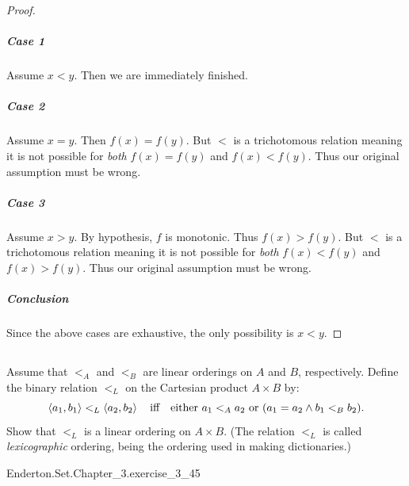 \documentclass{report}
\begin{document}
\begin{proof}
      \subparagraph{Case 1}%

        Assume $x < y$.
        Then we are immediately finished.

      \subparagraph{Case 2}%

        Assume $x = y$.
        Then $f(x) = f(y)$.
        But $<$ is a trichotomous relation meaning it is not possible for
          \textit{both} $f(x) = f(y)$ and $f(x) < f(y)$.
        Thus our original assumption must be wrong.

      \subparagraph{Case 3}%

        Assume $x > y$.
        By hypothesis, $f$ is monotonic.
        Thus $f(x) > f(y)$.
        But $<$ is a trichotomous relation meaning it is not possible for
          \textit{both} $f(x) < f(y)$ and $f(x) > f(y)$.
        Thus our original assumption must be wrong.

      \subparagraph{Conclusion}%

        Since the above cases are exhaustive, the only possibility is $x < y$.

  \end{proof}

\subsection{}%

  Assume that $<_A$ and $<_B$ are linear orderings on $A$ and $B$, respectively.
  Define the binary relation $<_L$ on the Cartesian product $A \times B$ by:
    $$\left< a_1, b_1 \right> <_L \left< a_2, b_2 \right> \quad\text{iff}\quad
      \text{either } a_1 <_A a_2 \text{ or } (a_1 = a_2 \land b_1 <_B b_2).$$
  Show that $<_L$ is a linear ordering on $A \times B$.
  (The relation $<_L$ is called \textit{lexicographic} ordering, being the
    ordering used in making dictionaries.)

    {Enderton.Set.Chapter\_3.exercise\_3\_45}
\end{document}
